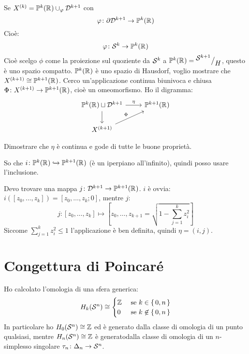 \begin{example}
  Se $ X^{(k)} = \mathbb{P}^k(\mathbb{R}^{}) \cup_\varphi \mathcal{D}^{k+1} $ con
  \[
    \varphi \colon \partial \mathcal{D}^{k+1}  \to \mathbb{P}^k(\mathbb{R}^{})
  \]
  Cioè:
  \[
    \varphi \colon \mathcal{S}^{k}  \to \mathbb{P}^k(\mathbb{R}^{})
  \]
  Cioè scelgo $ \phi $ come la proiezione sul quoziente da $ \mathcal{S}^{k} $ a $ \mathbb{P}^k(\mathbb{R}^{}) = {^{\textstyle \mathcal{S}^{k+1}}\big/_{\textstyle H}} $,
  questo è uno spazio compatto.
  $ \mathbb{P}^k(\mathbb{R}^{}) $ è uno spazio di Hausdorf, voglio mostrare che $ X^{(k+1)} \cong \mathbb{P}^{k+1}(\mathbb{R}^{}) $.
  Cerco un'applicazione continua biunivoca e chiusa $ \Phi \colon X^{(k+1)} \to  \mathbb{P}^{k+1}(\mathbb{R}^{}) $,
  cioè un omeomorfismo. Ho il digramma:
  \[
    \begin{tikzcd}
      \mathbb{P}^{k}(\RN{}) \sqcup \Disk{k+1} \arrow{r}{\eta} \arrow{d}{} &  \mathbb{P}^{k+1}(\RN{}) \\
      X^{(k+1)} \arrow{ru}{\Phi}
    \end{tikzcd}
  \]
  \begin{exercise}
    Dimostrare che $ \eta $ è continua e gode di tutte le buone proprietà.
  \end{exercise}
  So che $ i \colon  \mathbb{P}^{k}(\mathbb{R}^{}) \xhookrightarrow{} \mathbb{P}^{k+1}(\mathbb{R}^{}) $ (è un iperpiano all'infinito),
  quindi posso usare l'inclusione.

  Devo trovare una mappa $ j \colon \mathcal{D}^{k+1} \to \mathbb{P}^{k+1}(\mathbb{R}^{}) $. $ i $ è ovvia:
  $ i([z_0, \dots, z_k]) = [z_0, \dots, z_k; 0] $, mentre $ j $:
  \[
    j \colon [z_0, \dots, z_k] \mapsto  \left[z_0, \dots, z_{k+1} = \sqrt{1 - \sum_{j=1}^k z_i^2}\right]
  \]
  Siccome $ \sum_{j=1}^k z_i^2 \leq 1 $ l'applicazione è ben definita, quindi $ \eta = (i,j) $.
\end{example}





\section{Congettura di Poincaré}

Ho calcolato l'omologia di una sfera generica:
\[
  H_k(\mathcal{S}^{n}) \cong
  \begin{cases}
    \mathbb{Z} & \text{ se } k \in \set{0,n} \\
    0 & \text{ se } k \not \in \set{0,n}
  \end{cases}
\]
In particolare ho $ H_0(\mathcal{S}^{n}) \cong \mathbb{Z} $ ed è generato dalla classe di
omologia di un punto qualsiasi, mentre $ H_n(\mathcal{S}^{n}) \cong \mathbb{Z} $ è generatodalla
classe di omologia di un $ n $-simplesso singolare $ \tau_n \colon \Delta_n \to \mathcal{S}^{n} $.

